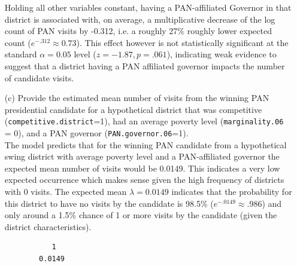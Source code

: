 \documentclass[12pt,letterpaper]{article}
\begin{document}
\begin{enumerate}
	Holding all other variables constant, having a PAN-affiliated Governor in that district is associated with, on average, a multiplicative decrease of the log count of PAN visits by -0.312, i.e. a roughly 27\% roughly lower expected count ($e^{-.312}\approx0.73$). This effect however is not statistically significant at the standard $\alpha = 0.05$ level ($z = -1.87, p = .061$), indicating weak evidence to suggest that a district having a PAN affiliated governor impacts the number of candidate visits. 
	
	\item [(c)]
	Provide the estimated mean number of visits from the winning PAN presidential candidate for a hypothetical district that was competitive (\texttt{competitive.district}=1), had an average poverty level (\texttt{marginality.06} = 0), and a PAN governor (\texttt{PAN.governor.06}=1). \\
	
		
	
	The model predicts that for the winning PAN candidate from a hypothetical swing district with average poverty level and a PAN-affiliated governor the expected mean number of visits would be 0.0149. This indicates a very low expected occurrence which makes sense given the high frequency of districts with 0 visits.  The expected mean $\lambda = 0.0149$ indicates that the probability for this district to have no visits by the candidate is 98.5\% ($e^{-.0149} \approx .986$) and only around a 1.5\% chance of 1 or more visits by the candidate (given the district characteristics).
	
	\begin{Verbatim}
		   1 
		0.0149
	\end{Verbatim}
	
\end{enumerate}
\end{document}
